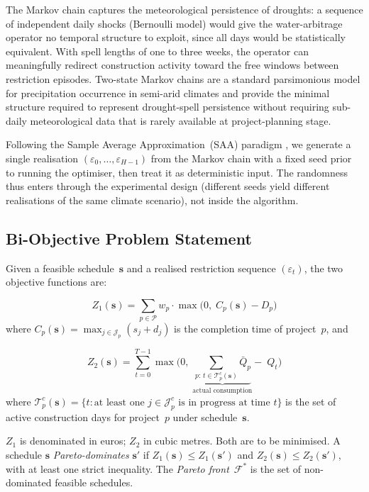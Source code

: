 \documentclass[12pt,a4paper]{article}
\newcommand{\Z}[1]{Z_{#1}}
\newcommand{\eps}{\varepsilon}
\newcommand{\Qbar}{\bar{Q}}
\begin{document}
The Markov chain captures the meteorological persistence of droughts: a sequence of
independent daily shocks (Bernoulli model) would give the water-arbitrage operator
no temporal structure to exploit, since all days would be statistically
equivalent.  With spell lengths of one to three weeks, the operator can meaningfully
redirect construction activity toward the free windows between restriction episodes.
Two-state Markov chains are a standard parsimonious model for precipitation
occurrence in semi-arid climates \citep{Scanlon2023} and provide the minimal
structure required to represent drought-spell persistence without requiring
sub-daily meteorological data that is rarely available at project-planning stage.

Following the Sample Average Approximation~(SAA) paradigm \citep{Kleywegt2002}, we
generate a single realisation $(\eps_0, \ldots, \eps_{H-1})$ from the Markov chain
with a fixed seed prior to running the optimiser, then treat it as deterministic
input.  The randomness thus enters through the experimental design (different seeds
yield different realisations of the same climate scenario), not inside the
algorithm.

\subsection{Bi-Objective Problem Statement}
\label{sec:model:biobj}

Given a feasible schedule~$\mathbf{s}$ and a realised restriction sequence
$(\eps_t)$, the two objective functions are:

\begin{equation}
  \Z{1}(\mathbf{s}) = \sum_{p \in \mathcal{P}} w_p \cdot \max\!\bigl(0,\;
  C_p(\mathbf{s}) - D_p\bigr)
  \label{eq:Z1}
\end{equation}
where $C_p(\mathbf{s}) = \max_{j \in \mathcal{J}_p} (s_j + d_j)$ is the completion
time of project~$p$, and

\begin{equation}
  \Z{2}(\mathbf{s}) = \sum_{t=0}^{T-1} \max\!\bigl(0,\;
  \underbrace{\sum_{p:\,t \in \mathcal{T}_p^c(\mathbf{s})} \Qbar_p}_{\text{actual consumption}}
  -\;Q_t\bigr)
  \label{eq:Z2}
\end{equation}
where $\mathcal{T}_p^c(\mathbf{s}) = \{t : \text{at least one } j \in
\mathcal{J}_p^c \text{ is in progress at time } t\}$ is the set of active
construction days for project~$p$ under schedule~$\mathbf{s}$.

$\Z{1}$ is denominated in euros; $\Z{2}$ in cubic metres.  Both are to be
minimised.  A schedule $\mathbf{s}$ \emph{Pareto-dominates} $\mathbf{s}'$ if
$\Z{1}(\mathbf{s}) \leq \Z{1}(\mathbf{s}')$ and
$\Z{2}(\mathbf{s}) \leq \Z{2}(\mathbf{s}')$, with at least one strict inequality.
The \emph{Pareto front}~$\mathcal{F}^*$ is the set of non-dominated feasible
schedules.
\end{document}
